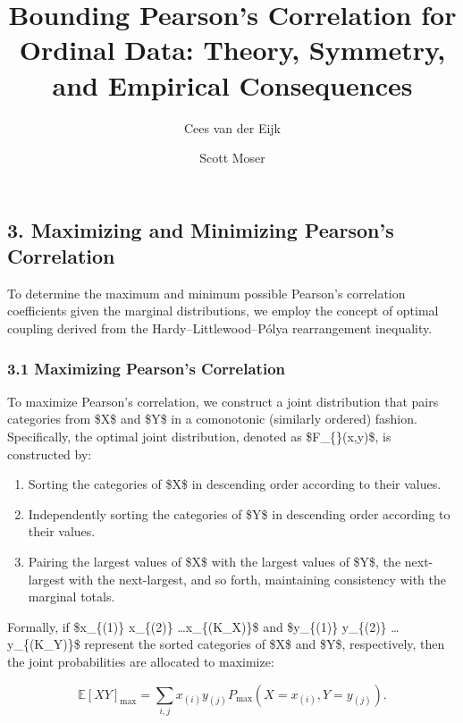 \documentclass[
  12pt,
]{article}
\title{Bounding Pearson's Correlation for Ordinal Data: Theory,
Symmetry, and Empirical Consequences}
\author{Cees van der Eijk \and Scott Moser}
\date{}
\providecommand{\tightlist}{%
  \setlength{\itemsep}{0pt}\setlength{\parskip}{0pt}}\usepackage{longtable,booktabs,array}
\renewcommand*\contentsname{Table of contents}
\newcommand\contentsname{Table of contents}
\begin{document}
\maketitle

\renewcommand*\contentsname{Table of contents}
{
\hypersetup{linkcolor=}
\setcounter{tocdepth}{3}
\tableofcontents
}

\subsection{3. Maximizing and Minimizing Pearson's
Correlation}\label{maximizing-and-minimizing-pearsons-correlation}

To determine the maximum and minimum possible Pearson's correlation
coefficients given the marginal distributions, we employ the concept of
optimal coupling derived from the Hardy--Littlewood--Pólya rearrangement
inequality.

\subsubsection{3.1 Maximizing Pearson's
Correlation}\label{maximizing-pearsons-correlation}

To maximize Pearson's correlation, we construct a joint distribution
that pairs categories from \$X\$ and \$Y\$ in a comonotonic (similarly
ordered) fashion. Specifically, the optimal joint distribution, denoted
as \$F\_\{\}(x,y)\$, is constructed by:

\begin{enumerate}
\def\labelenumi{\arabic{enumi}.}
\tightlist
\item
  Sorting the categories of \$X\$ in descending order according to their
  values.
\item
  Independently sorting the categories of \$Y\$ in descending order
  according to their values.
\item
  Pairing the largest values of \$X\$ with the largest values of \$Y\$,
  the next-largest with the next-largest, and so forth, maintaining
  consistency with the marginal totals.
\end{enumerate}

Formally, if \$x\_\{(1)\} \geq x\_\{(2)\}
\geq \dots \geq x\_\{(K\_X)\}\$ and \$y\_\{(1)\} \geq y\_\{(2)\}
\geq \dots \geq y\_\{(K\_Y)\}\$ represent the sorted categories of \$X\$
and \$Y\$, respectively, then the joint probabilities are allocated to
maximize:

\[
\mathbb{E}[XY]_{\text{max}} = \sum_{i,j} x_{(i)} y_{(j)} P_{\text{max}}(X = x_{(i)}, Y = y_{(j)}).
\]
\end{document}

